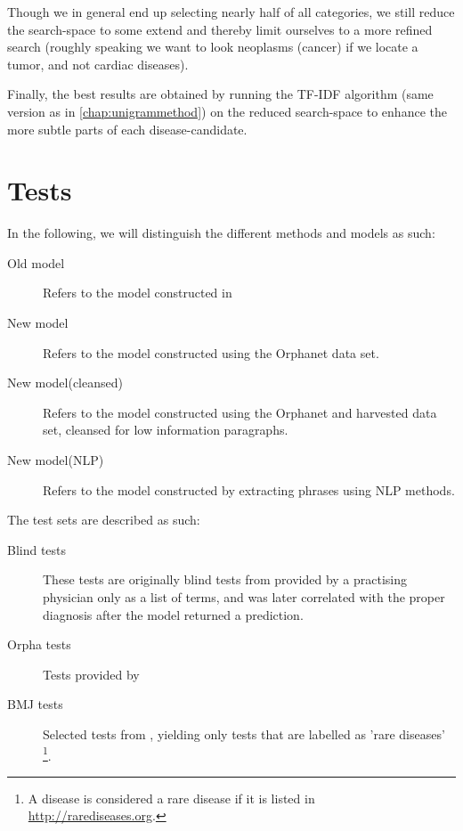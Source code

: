 \documentclass[10pt,letterpaper,final]{article}
\begin{document}
Though we in general end up selecting nearly half of all categories, we still reduce the search-space to some extend and thereby limit ourselves to a more refined search (roughly speaking we want to look neoplasms (cancer) if we locate a tumor, and not cardiac diseases).

Finally, the best results are obtained by running the TF-IDF algorithm (same version as in \ref{chap:unigrammethod}) on the reduced search-space to enhance the more
subtle parts of each disease-candidate.

\section{Tests}
\label{chap:test}
In the following, we will distinguish the different methods and models
as such:
\begin{description}
\item[Old model] Refers to the model constructed in
\cite{jensenandersen}
\item[New model] Refers to the model constructed using the Orphanet data
set.
\item[New model(cleansed)] Refers to the model constructed using the
Orphanet and harvested data set, cleansed for low information
paragraphs.
\item[New model(NLP)] Refers to the model constructed by extracting
phrases using NLP methods.
\end{description}

\noindent The test sets are described as such:

\begin{description}
\item[Blind tests] These tests are originally blind tests from
\cite{jensenandersen} provided by a practising physician only as a list
of terms, and was later correlated with the proper diagnosis after the
model returned a prediction.
\item[Orpha tests] Tests provided by 
\item[BMJ tests] Selected tests from \cite{googlingdiagnosis}, yielding
only tests that are labelled as 'rare diseases' \footnote{A disease is
considered a rare disease if it is listed in
\url{http://rarediseases.org}.}.
\end{description}


\end{document}
